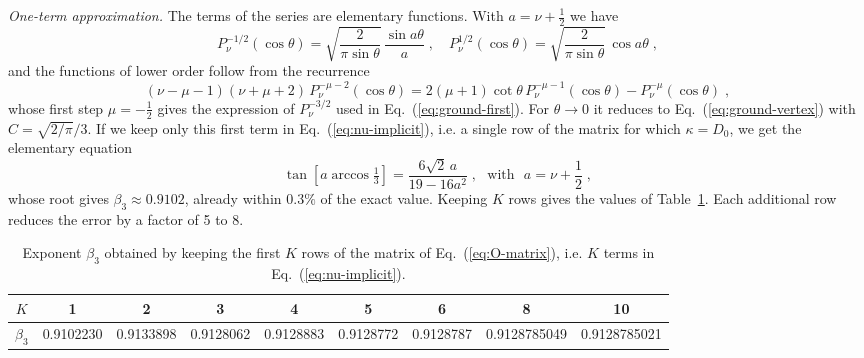 \emph{One-term approximation.} The terms of the series are elementary functions. With $a = \nu + \frac{1}{2}$ we have \cite{DLMF}
\begin{equation} \label{S:half-order}
    P_\nu^{-1/2}(\cos \theta) = \sqrt{\frac{2}{\pi \sin \theta}} \, \frac{\sin a \theta}{a} \;, \quad P_\nu^{1/2}(\cos \theta) = \sqrt{\frac{2}{\pi \sin \theta}} \, \cos a \theta \;,
\end{equation}
and the functions of lower order follow from the recurrence
\begin{equation} \label{S:order-recurrence}
    (\nu - \mu - 1)(\nu + \mu + 2) \, P_\nu^{-\mu-2}(\cos \theta) = 2 (\mu + 1) \cot \theta \, P_\nu^{-\mu-1}(\cos \theta) - P_\nu^{-\mu}(\cos \theta) \;,
\end{equation}
whose first step $\mu = -\frac{1}{2}$ gives the expression of $P_\nu^{-3/2}$ used in Eq.~(\ref{eq:ground-first}). For $\theta \to 0$ it reduces to Eq.~(\ref{eq:ground-vertex}) with $C = \sqrt{2/\pi}/3$. If we keep only this first term in Eq.~(\ref{eq:nu-implicit}), i.e. a single row of the matrix for which $\kappa = D_0$, we get the elementary equation
\begin{equation} \label{S:one-term}
    \tan\left[ a \arccos \tfrac{1}{3} \right] = \frac{6 \sqrt{2} \, a}{19 - 16 a^2} \;, \mbox{~~with~~} a = \nu + \frac{1}{2} \;,
\end{equation}
whose root gives $\beta_3 \approx 0.9102$, already within $0.3\%$ of the exact value. Keeping $K$ rows gives the values of Table~\ref{S:tab-trunc}. Each additional row reduces the error by a factor of 5 to 8.

\begin{table}[h]
\caption{Exponent $\beta_3$ obtained by keeping the first $K$ rows of the matrix of Eq.~(\ref{eq:O-matrix}), i.e. $K$ terms in Eq.~(\ref{eq:nu-implicit}).}
\label{S:tab-trunc}
\begin{ruledtabular}
\begin{tabular}{ccccccccc}
$K$ & 1 & 2 & 3 & 4 & 5 & 6 & 8 & 10\\
\hline
$\beta_3$ & 0.9102230 & 0.9133898 & 0.9128062 & 0.9128883 & 0.9128772 & 0.9128787 & 0.9128785049 & 0.9128785021\\
\end{tabular}
\end{ruledtabular}
\end{table}

